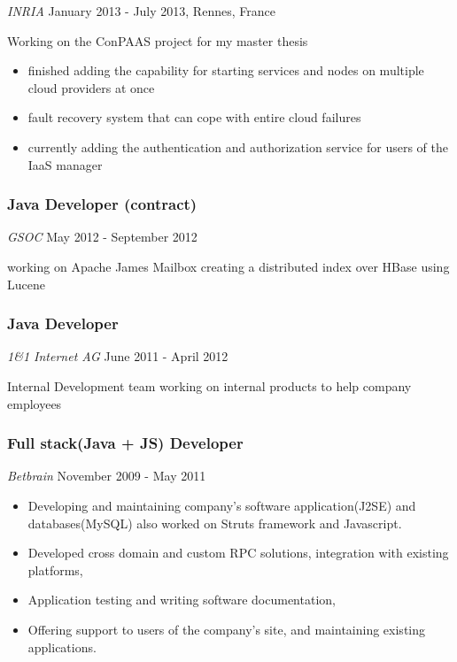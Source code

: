 \documentclass[
]{rss}
\providecommand{\tightlist}{%
  \setlength{\itemsep}{0pt}\setlength{\parskip}{0pt}}
\begin{document}
\begin{resume}
\emph{INRIA} January 2013 - July 2013, Rennes, France

Working on the ConPAAS project for my master thesis

\begin{itemize}
\tightlist
\item
  finished adding the capability for starting services and nodes on
  multiple cloud providers at once
\item
  fault recovery system that can cope with entire cloud failures
\item
  currently adding the authentication and authorization service for
  users of the IaaS manager
\end{itemize}

\hypertarget{java-developer-contract}{%
\subsubsection{Java Developer
(contract)}\label{java-developer-contract}}

\emph{GSOC} May 2012 - September 2012

working on Apache James Mailbox creating a distributed index over HBase
using Lucene

\hypertarget{java-developer}{%
\subsubsection{Java Developer}\label{java-developer}}

\emph{1\&1 Internet AG} June 2011 - April 2012

Internal Development team working on internal products to help company
employees

\hypertarget{full-stackjava-js-developer}{%
\subsubsection{Full stack(Java + JS)
Developer}\label{full-stackjava-js-developer}}

\emph{Betbrain} November 2009 - May 2011

\begin{itemize}
\tightlist
\item
  Developing and maintaining company's software application(J2SE) and
  databases(MySQL) also worked on Struts framework and Javascript.
\item
  Developed cross domain and custom RPC solutions, integration with
  existing platforms,
\item
  Application testing and writing software documentation,
\item
  Offering support to users of the company's site, and maintaining
  existing applications.
\end{itemize}


\end{resume}
\end{document}
